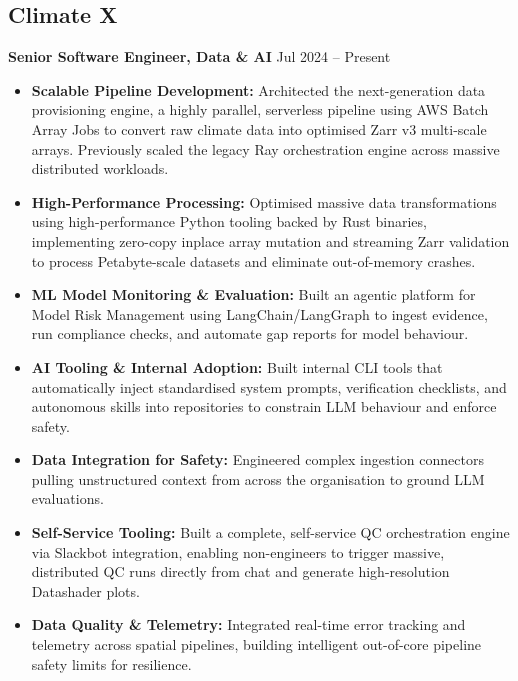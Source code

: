 \documentclass[10pt,a4paper]{article}
\newcommand{\cvitem}[2]{\textbf{#1} \hspace*{\fill} {\small\color{textlight}#2}\\}
\begin{document}
\subsection*{Climate X}
\cvitem{Senior Software Engineer, Data \& AI}{Jul 2024 -- Present}
\begin{itemize}
    \item \textbf{Scalable Pipeline Development:} Architected the next-generation data provisioning engine, a highly parallel, serverless pipeline using AWS Batch Array Jobs to convert raw climate data into optimised Zarr v3 multi-scale arrays. Previously scaled the legacy Ray orchestration engine across massive distributed workloads.
    \item \textbf{High-Performance Processing:} Optimised massive data transformations using high-performance Python tooling backed by Rust binaries, implementing zero-copy inplace array mutation and streaming Zarr validation to process Petabyte-scale datasets and eliminate out-of-memory crashes.
    \item \textbf{ML Model Monitoring \& Evaluation:} Built an agentic platform for Model Risk Management using LangChain/LangGraph to ingest evidence, run compliance checks, and automate gap reports for model behaviour.
    \item \textbf{AI Tooling \& Internal Adoption:} Built internal CLI tools that automatically inject standardised system prompts, verification checklists, and autonomous skills into repositories to constrain LLM behaviour and enforce safety.
    \item \textbf{Data Integration for Safety:} Engineered complex ingestion connectors pulling unstructured context from across the organisation to ground LLM evaluations.
    \item \textbf{Self-Service Tooling:} Built a complete, self-service QC orchestration engine via Slackbot integration, enabling non-engineers to trigger massive, distributed QC runs directly from chat and generate high-resolution Datashader plots.
    \item \textbf{Data Quality \& Telemetry:} Integrated real-time error tracking and telemetry across spatial pipelines, building intelligent out-of-core pipeline safety limits for resilience.
\end{itemize}
\end{document}
